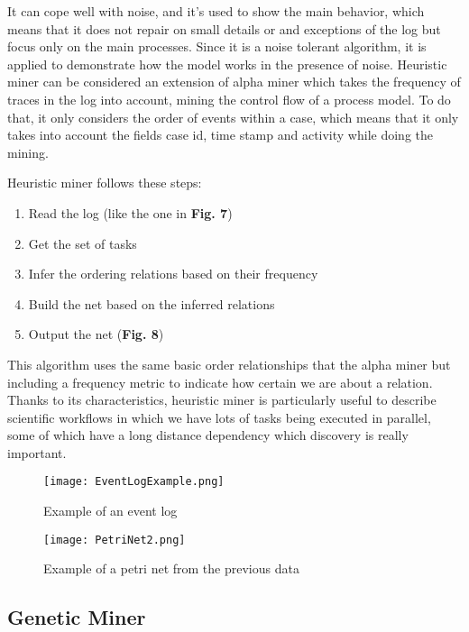 \documentclass[conference]{IEEEtran}
\begin{document}
It can cope well with noise, and it’s used to show the main behavior, which means that it does not repair on small details or and exceptions of the log but focus only on the main processes. Since it is a noise tolerant algorithm, it is applied to demonstrate how the model works in the presence of noise.
Heuristic miner can be considered an extension of alpha miner which takes the frequency of traces in the log into account, mining the control flow of a process model. To do that, it only considers the order of events within a case, which means that it only takes into account the fields case id, time stamp and activity while doing the mining.

Heuristic miner follows these steps:

\begin{enumerate}
    \item Read the log (like the one in \textbf{Fig. 7})
    \item Get the set of tasks
    \item Infer the ordering relations based on their frequency
    \item Build the net based on the inferred relations
    \item Output the net (\textbf{Fig. 8})
\end{enumerate}

This algorithm uses the same basic order relationships that the alpha miner but including a frequency metric to indicate how certain we are about a relation.
Thanks to its characteristics, heuristic miner is particularly useful to describe scientific workflows in which we have lots of tasks being executed in parallel, some of which have a long distance dependency which discovery is really important.

\begin{figure}[htp]
    \centering
    \texttt{[image: EventLogExample.png]}
    \caption{Example of an event log}
    \label{fig:modelDrawn}
\end{figure}

\begin{figure}[htp]
    \centering
    \texttt{[image: PetriNet2.png]}
    \caption{Example of a petri net from the previous data}
    \label{fig:modelDrawn}
\end{figure}

\subsection{Genetic Miner}
\end{document}
